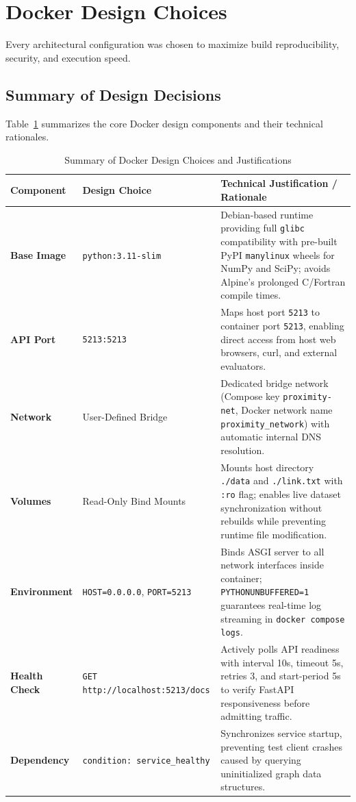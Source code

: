 \documentclass[11pt,a4paper]{article}
\begin{document}
\section{Docker Design Choices}

Every architectural configuration was chosen to maximize build reproducibility, security, and execution speed.

\subsection{Summary of Design Decisions}
Table~\ref{tab:design_choices} summarizes the core Docker design components and their technical rationales.

\begin{table}[H]
\centering
\small
\caption{Summary of Docker Design Choices and Justifications}
\label{tab:design_choices}
\begin{tabular}{@{}llp{8.4cm}@{}}
\toprule
\textbf{Component} & \textbf{Design Choice} & \textbf{Technical Justification / Rationale} \\ \midrule
\textbf{Base Image} & \texttt{python:3.11-slim} & Debian-based runtime providing full \texttt{glibc} compatibility with pre-built PyPI \texttt{manylinux} wheels for NumPy and SciPy; avoids Alpine's prolonged C/Fortran compile times. \\
\textbf{API Port} & \texttt{5213:5213} & Maps host port \texttt{5213} to container port \texttt{5213}, enabling direct access from host web browsers, curl, and external evaluators. \\
\textbf{Network} & User-Defined Bridge & Dedicated bridge network (Compose key \texttt{proximity-net}, Docker network name \texttt{proximity\_network}) with automatic internal DNS resolution. \\
\textbf{Volumes} & Read-Only Bind Mounts & Mounts host directory \texttt{./data} and \texttt{./link.txt} with \texttt{:ro} flag; enables live dataset synchronization without rebuilds while preventing runtime file modification. \\
\textbf{Environment} & \texttt{HOST=0.0.0.0}, \texttt{PORT=5213} & Binds ASGI server to all network interfaces inside container; \texttt{PYTHONUNBUFFERED=1} guarantees real-time log streaming in \texttt{docker compose logs}. \\
\textbf{Health Check} & \texttt{GET http://localhost:5213/docs} & Actively polls API readiness with interval 10s, timeout 5s, retries 3, and start-period 5s to verify FastAPI responsiveness before admitting traffic. \\
\textbf{Dependency} & \texttt{condition: service\_healthy} & Synchronizes service startup, preventing test client crashes caused by querying uninitialized graph data structures. \\ \bottomrule
\end{tabular}
\end{table}
\end{document}
